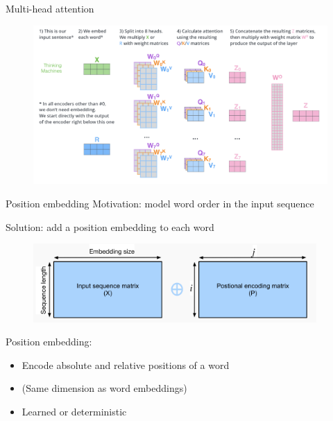 \documentclass[usenames,dvipsnames,notes]{beamer}
\begin{document}
\begin{frame}
    {Multi-head attention}
    \begin{figure}
        \includegraphics[width=.9\textwidth]{figures/multi-head}
    \end{figure}
\end{frame}

\begin{frame}
    {Position embedding}
    Motivation: model word order in the input sequence

    Solution: add a position embedding to each word
    \begin{figure}
        \includegraphics[height=3cm]{figures/position-embedding}
    \end{figure}

    Position embedding:\\
    \begin{itemize}
        \item Encode absolute and relative positions of a word
        \item (Same dimension as word embeddings)
        \item Learned or deterministic 
    \end{itemize}
\end{frame}
\end{document}
